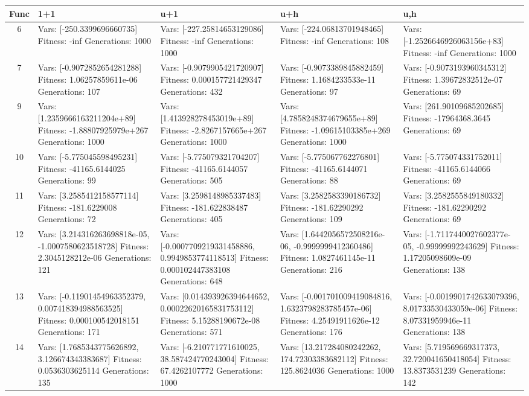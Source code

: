 \documentclass[landscape,11pt]{article}
\begin{document}
\begin{tabular}{|c|p{5.4cm}|p{5.4cm}|p{5.4cm}|p{5.4cm}|}
\hline
Func & 1+1 & u+1 & u+h & u,h \\ 
\hline 6 & Vars: [-250.3399696660735] Fitness: -inf Generations: 1000 & Vars: [-227.25814653129086] Fitness: -inf Generations: 1000 & Vars: [-224.06813701948465] Fitness: -inf Generations: 108 & Vars: [-1.2526646926063156e+83] Fitness: -inf Generations: 1000 \\
 \hline 
 7 & Vars: [-0.9072852654281288] Fitness: 1.06257859611e-06 Generations: 107 & Vars: [-0.9079905421720907] Fitness: 0.000157721429347 Generations: 432 & Vars: [-0.9073389845882459] Fitness: 1.1684233533e-11 Generations: 97 & Vars: [-0.9073193960345312] Fitness: 1.39672832512e-07 Generations: 69 \\
 \hline 
 9 & Vars: [1.2359666163211204e+89] Fitness: -1.88807925979e+267 Generations: 1000 & Vars: [1.413928278453019e+89] Fitness: -2.8267157665e+267 Generations: 1000 & Vars: [4.7858248374679655e+89] Fitness: -1.09615103385e+269 Generations: 1000 & Vars: [261.90109685202685] Fitness: -17964368.3645 Generations: 69 \\
 \hline 
 10 & Vars: [-5.775045598495231] Fitness: -41165.6144025 Generations: 99 & Vars: [-5.775079321704207] Fitness: -41165.6144057 Generations: 505 & Vars: [-5.775067762276801] Fitness: -41165.6144071 Generations: 88 & Vars: [-5.775074331752011] Fitness: -41165.6144066 Generations: 69 \\
 \hline 
 11 & Vars: [3.2585412158577114] Fitness: -181.6229008 Generations: 72 & Vars: [3.2598148985337483] Fitness: -181.622838487 Generations: 405 & Vars: [3.2582583390186732] Fitness: -181.62290292 Generations: 109 & Vars: [3.2582555849180332] Fitness: -181.62290292 Generations: 69 \\
 \hline 
 12 & Vars: [3.214316263698818e-05, -1.0007580623518728] Fitness: 2.3045128212e-06 Generations: 121 & Vars: [-0.0007709219331458886, 0.9949853774118513] Fitness: 0.000102447383108 Generations: 648 & Vars: [1.6442056572508216e-06, -0.9999999412360486] Fitness: 1.0827461145e-11 Generations: 216 & Vars: [-1.7117440027602377e-05, -0.99999992243629] Fitness: 1.17205098609e-09 Generations: 138 \\
 \hline 
 13 & Vars: [-0.11901454963352379, 0.007418394988563525] Fitness: 0.000100542018151 Generations: 171 & Vars: [0.014393926394644652, 0.00022620165831753112] Fitness: 5.15288190672e-08 Generations: 571 & Vars: [-0.001701009419084816, 1.6323798283785457e-06] Fitness: 4.25491911626e-12 Generations: 176 & Vars: [-0.0019901742633079396, 8.01733530433059e-06] Fitness: 8.07331959946e-11 Generations: 138 \\
 \hline 
 14 & Vars: [1.7685343775626892, 3.126674343383687] Fitness: 0.0536303625114 Generations: 135 & Vars: [-6.210771771610025, 38.587424770243004] Fitness: 67.4262107772 Generations: 1000 & Vars: [13.217284080242262, 174.72303383682112] Fitness: 125.8624036 Generations: 1000 & Vars: [5.719569669317373, 32.720041650418054] Fitness: 13.8373531239 Generations: 142 \\
 \hline 
\end{tabular}
\end{document}
